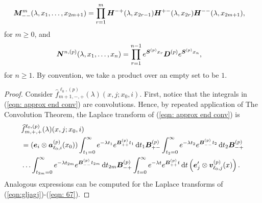 \begin{lem}
\begin{align*}
			\\\boldsymbol M^{m}_{--}(\lambda,x_1,\dots,x_{2m+1}) \nonumber 
			&= \prod_{r=1}^{m}\boldsymbol H^{-+}(\lambda,x_{2r-1})\boldsymbol H^{+-}(\lambda,x_{2r}) 
			\boldsymbol H^{--}(\lambda,x_{2m+1}),\nonumber  
	\end{align*}
	for \(m\geq 0\), and
	\begin{align*}
		\boldsymbol N^{n,(p)}(\lambda,x_1,\dots,x_{n}) &= \prod_{r=1}^{n-1} e^{\boldsymbol{S}^{(p)}x_{r}}\boldsymbol{D}^{(p)} e^{\boldsymbol{S}^{(p)}x_{n}}, \nonumber 
	\end{align*}
	for \(n\geq 1\). By convention, we take a product over an empty set to be \(1\).
\end{lem}
\begin{proof}
Consider \(\widehat f^{\ell_0,(p)}_{m+1,-,+}(\lambda)(x, j; x_0,i)\). First, notice that the integrals in (\ref{eqn: approx end conv}) are convolutions. Hence, by repeated application of The Convolution Theorem, the Laplace transform of (\ref{eqn: approx end conv}) is
\begin{align}
	&\widehat f^{\ell_0,(p)}_{m,+,+}(\lambda)(x, j; x_0,i) \nonumber 
	\\&=(\boldsymbol e_i\otimes \boldsymbol  a_{\ell_0,i}^{(p)}(x_0))  \int_{t_1=0}^\infty e^{-\lambda t_1} e^{\boldsymbol{B}^{(p)}_{++}t_1} \, \mathrm{d} t_1 \boldsymbol{B}^{(p)}_{+{-}} \nonumber
	\int_{t_2=0}^\infty e^{-\lambda t_2} e^{\boldsymbol{B}^{(p)}_{--}t_2} \, \mathrm{d} t_2\boldsymbol{B}^{(p)}_{-{+}} 
	\\&\hdots 
	\int_{t_{2m}=0}^\infty e^{-\lambda t_{2m}}e^{\boldsymbol{B}^{(p)}_{--}t_{2m}} \, \mathrm{d} t_{2m}\boldsymbol{B}^{(p)}_{-{+}} 
	\int_{t=0}^\infty e^{-\lambda t}e^{\boldsymbol{B}^{(p)}_{++}t} \, \mathrm{d} t 
	\left(\boldsymbol e_j'{} \otimes {\boldsymbol v}_{\ell_0,j}^{(p)}(x)\right). \label{eqn: approx end conv lst}
\end{align}
Analogous expressions can be computed for the Laplace transforms of (\ref{eqn:gljagj})-(\ref{eqn: 67}). 


\end{proof}
